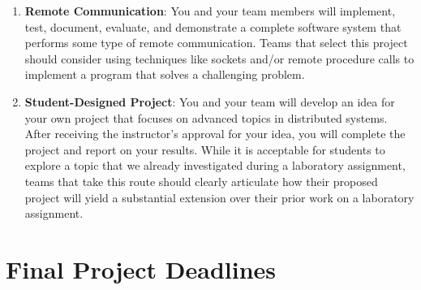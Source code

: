 \begin{enumerate}
  \item {\bf Remote Communication}: You and your team members will implement, test, document, evaluate, and
    demonstrate a complete software system that performs some type of remote communication.  Teams that select this
    project should consider using techniques like sockets and/or remote procedure calls to implement a program that solves
    a challenging problem.

  \item {\bf Student-Designed Project}: You and your team will develop an idea for your own project that focuses on
    advanced topics in distributed systems. After receiving the instructor's approval for your idea, you will complete
    the project and report on your results. While it is acceptable for students to explore a topic that we already
    investigated during a laboratory assignment, teams that take this route should clearly articulate how their proposed
    project will yield a substantial extension over their prior work on a laboratory assignment.

\end{enumerate}

\vspace*{-.05in}

\section*{Final Project Deadlines}



